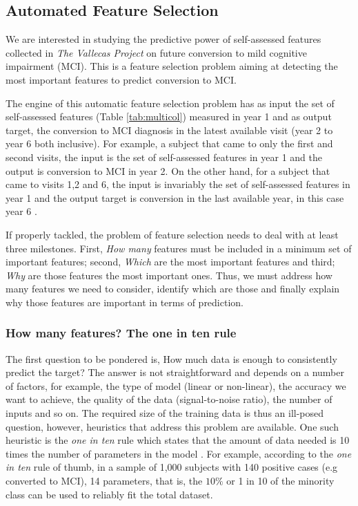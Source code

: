 \documentclass[preprint,12pt]{elsarticle}
\begin{document}

\subsection{Automated Feature Selection}
\label{se:automated}
We are interested in studying the predictive power of self-assessed features collected in \emph{The Vallecas Project} on future conversion to mild cognitive impairment (MCI). This is a feature selection problem aiming at detecting the most important features to predict conversion to MCI. 

The engine of this automatic feature selection problem has as input the set of self-assessed features (Table \ref{tab:multicol}) measured in year 1 and as output target, the conversion to MCI diagnosis in the latest available visit (year 2 to year 6 both inclusive). For example, a subject that came to only the first and second visits, the input is the set of self-assessed features in year 1 and the output is conversion to MCI in year 2. On the other hand, for a subject that came to visits 1,2 and 6, the input is invariably the set of self-assessed features in year 1 and the output target is conversion in the last available year, in this case year 6 . %

If properly tackled, the problem of feature selection needs to deal with at least three milestones. First, \emph{How many} features must be included in a minimum set of important features; second, \emph{Which} are the most important features and third; \emph{Why} are those features the most important ones. Thus, we must address how many features we need to consider, identify which are those and finally explain why those features are important in terms of prediction.

\subsubsection{How many features? The one in ten rule}
\label{sse:Howmany}
The first question to be pondered is, How much data is enough to consistently predict the target? The answer is not straightforward and depends on a number of factors, for example, the type of model (linear or non-linear), the accuracy we want to achieve, the quality of the data (signal-to-noise ratio), the number of inputs and so on. The required size of the training data is thus an ill-posed question, however, heuristics that address this problem are available. One such heuristic is the \emph{one in ten} rule which states that the amount of data needed is 10 times the number of parameters in the model \cite{harrell2001reg}. For example, according to the \emph{one in ten} rule of thumb, in a sample of 1,000 subjects with 140 positive cases (e.g converted to MCI), 14 parameters, that is, the $10\%$ or 1 in 10 of the minority class can be used to reliably fit the total dataset. 
\end{document}
